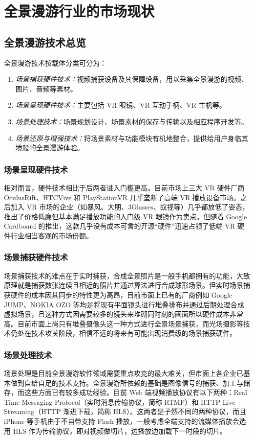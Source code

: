 \chapter{全景漫游行业的市场现状}

\section{全景漫游技术总览}

全景漫游技术按载体分类可分为：
\begin{enumerate}
\item{\emph{场景捕获硬件技术：}视频捕获设备及其保障设备，用以采集全景漫游的视频、图片、音频等素材。}
\item{\emph{场景呈现硬件技术：}主要包括 VR 眼镜、VR 互动手柄、VR 主机等。}
\item{\emph{场景处理技术：}场景规划设计、场景素材的保存与传输以及相应程序开发等。}
\item{\emph{场景还原与增强技术：}将场景素材与功能模块有机地整合，提供给用户身临其境般的全景漫游体验。}
\end{enumerate}

\subsection{场景呈现硬件技术}
相对而言，硬件技术相比于后两者进入门槛更高。目前市场上三大 VR 硬件厂商 OculusRift、HTCVive 和 PlayStationVR 几乎垄断了高端 VR 播放设备市场。之后加入 VR 市场的企业（如暴风、大朋、3Glasses、蚁视等）几乎都放低了姿态，推出了价格低廉但基本满足播放功能的入门级 VR 眼镜作为卖点。但随着 Google Cardboard 的推出，这款几乎没有成本可言的开源“硬件”迅速占领了低端 VR 硬件行业相当客观的市场份额。

\subsection{场景捕获硬件技术}
场景捕获技术的难点在于实时捕获，合成全景照片是一般手机都拥有的功能，大致原理就是捕获数张连续且相近的照片并通过算法进行合成球形场景。但实时场景捕获硬件的成本因其同步的特性更为高昂，目前市面上已有的厂商例如 Google JUMP、NOKIA OZO 等均是将现有平面镜头进行堆叠排布并通过后期处理合成虚拟场景，且这种方式因需要较多的镜头来堆砌同时刻的画面所以硬件成本非常高。目前市面上尚只有堆叠摄像头这一种方式进行全景场景捕获，而光场摄影等技术仍处在技术攻关阶段，相信不远的将来有可能出现消费级的场景捕获硬件。

\subsection{场景处理技术}
场景处理是目前全景漫游软件领域需要重点攻克的最大难关，但市面上各企业已基本做到自给自足的技术支持。全景漫游所依赖的基础是图像信号的捕获、加工与储存，而这些方面已有较多成功经验。目前 Web 端视频播放协议有以下两种：Real Time Messaging Protocol（实时消息传输协议，简称 RTMP）和 HTTP Live Streaming（HTTP 渐进下载，简称 HLS）。这两者是孑然不同的两种协议，而且 iPhone 等手机由于不自带支持 Flash 播放，一般考虑全端支持的流媒体播放会选用 HLS 作为传输协议，即对视频做切片，边播放边加载下一时段的切片。

